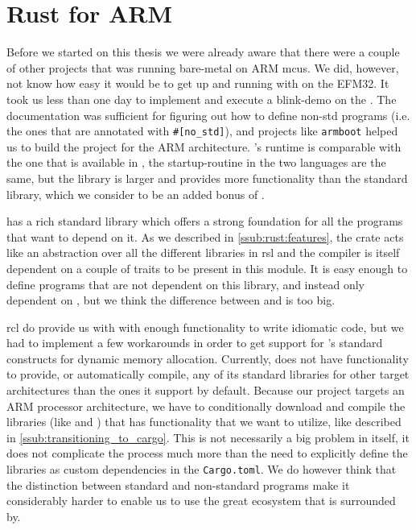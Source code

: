 
\section{Rust for ARM} %
\label{sec:disc:rust_for_arm}

Before we started on this thesis we were already aware that there were a couple of other projects that was running {\rust} bare-metal on ARM \glspl{mcu}.
We did, however, not know how easy it would be to get up and running with {\rust} on the EFM32.
It took us less than one day to implement and execute a {\rust} blink-demo on the {\STK}.
The {\rust} documentation was sufficient for figuring out how to define non-std {\rust} programs (i.e. the ones that are annotated with \texttt{\#[no\_std]}), and projects like \texttt{armboot} helped us to build the project for the ARM architecture.
{\rust}'s runtime is comparable with the one that is available in {\C}, the startup-routine in the two languages are the same, but the {\core} library is larger and provides more functionality than the {\C} standard library, which we consider to be an added bonus of {\rust}.

{\rust} has a rich standard library which offers a strong foundation for all the programs that want to depend on it.
As we described in \autoref{ssub:rust:features}, the {\std} crate acts like an abstraction over all the different libraries in \gls{rsl} and the {\rustc} compiler is itself dependent on a couple of traits to be present in this module.
It is easy enough to define programs that are not dependent on this {\std} library, and instead only dependent on {\core}, but we think the difference between {\std} and {\core} is too big.

\gls{rcl} do provide us with with enough functionality to write idiomatic {\rust} code, but we had to implement a few workarounds in order to get support for {\rust}'s standard constructs for dynamic memory allocation.
Currently, {\rust} does not have functionality to provide, or automatically compile, any of its standard libraries for other target architectures than the ones it support by default.
Because our project targets an ARM processor architecture, we have to conditionally download and compile the libraries (like  and ) that has functionality that we want to utilize, like described in \autoref{ssub:transitioning_to_cargo}.
This is not necessarily a big problem in itself, it does not complicate the process much more than the need to explicitly define the libraries as custom dependencies in the \texttt{Cargo.toml}.
We do however think that the distinction between standard and non-standard programs make it considerably harder to enable us to use the great ecosystem that {\rust} is surrounded by.


